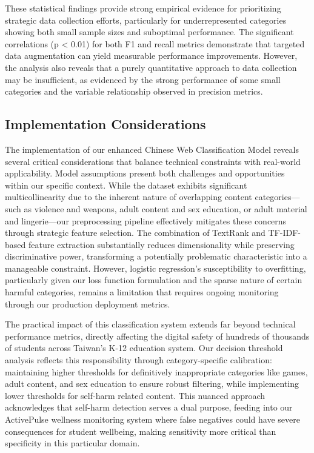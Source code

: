 \documentclass[
  titlepage]{article}
\begin{document}
These statistical findings provide strong empirical evidence for
prioritizing strategic data collection efforts, particularly for
underrepresented categories showing both small sample sizes and
suboptimal performance. The significant correlations (p \textless{}
0.01) for both F1 and recall metrics demonstrate that targeted data
augmentation can yield measurable performance improvements. However, the
analysis also reveals that a purely quantitative approach to data
collection may be insufficient, as evidenced by the strong performance
of some small categories and the variable relationship observed in
precision metrics.

\subsection{Implementation
Considerations}\label{implementation-considerations}

The implementation of our enhanced Chinese Web Classification Model
reveals several critical considerations that balance technical
constraints with real-world applicability. Model assumptions present
both challenges and opportunities within our specific context. While the
dataset exhibits significant multicollinearity due to the inherent
nature of overlapping content categories---such as violence and weapons,
adult content and sex education, or adult material and lingerie---our
preprocessing pipeline effectively mitigates these concerns through
strategic feature selection. The combination of TextRank and
TF-IDF-based feature extraction substantially reduces dimensionality
while preserving discriminative power, transforming a potentially
problematic characteristic into a manageable constraint. However,
logistic regression's susceptibility to overfitting, particularly given
our loss function formulation and the sparse nature of certain harmful
categories, remains a limitation that requires ongoing monitoring
through our production deployment metrics.

The practical impact of this classification system extends far beyond
technical performance metrics, directly affecting the digital safety of
hundreds of thousands of students across Taiwan's K-12 education system.
Our decision threshold analysis reflects this responsibility through
category-specific calibration: maintaining higher thresholds for
definitively inappropriate categories like games, adult content, and sex
education to ensure robust filtering, while implementing lower
thresholds for self-harm related content. This nuanced approach
acknowledges that self-harm detection serves a dual purpose, feeding
into our ActivePulse wellness monitoring system where false negatives
could have severe consequences for student wellbeing, making sensitivity
more critical than specificity in this particular domain.
\end{document}
